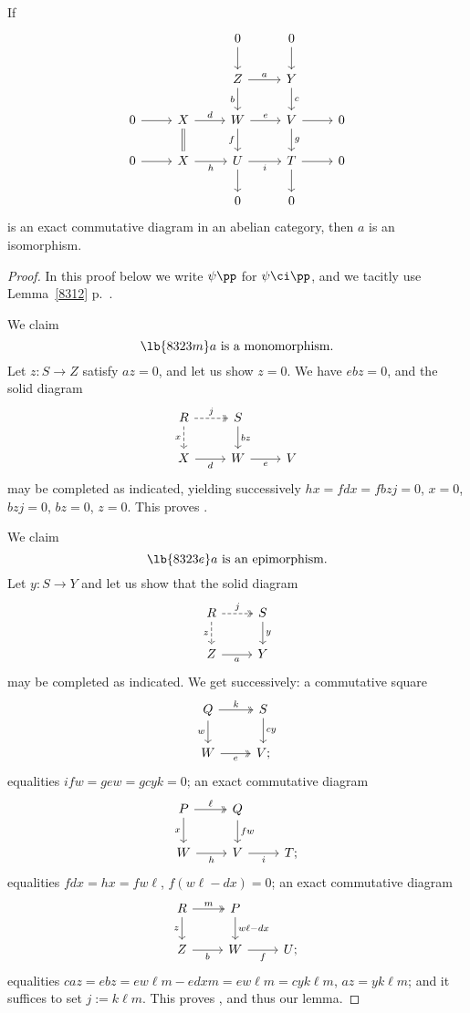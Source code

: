 \documentclass[12pt]{article}
\theoremstyle{remark}
\theoremstyle{definition}
\begin{document}
\begin{lem}
If
$$
\begin{tikzcd}
&&0\ar[d]&0\ar[d]\\ 
&&Z\ar[d,"b"']\ar[r,"a"]&Y\ar[d,"c"]\\ 
0\ar[r]&X\ar[d,equal]\ar[r,"d"]&W\ar[d,"f"']\ar[r,"e"]&V\ar[d,"g"]\ar[r]&0\\ 
0\ar[r]&X\ar[r,"h"']&U\ar[d]\ar[r,"i"']&T\ar[d]\ar[r]&0\\ 
&&0&0
\end{tikzcd}
$$ 
is an exact commutative diagram in an abelian category, then $a$ is an isomorphism. 
\end{lem}

\begin{proof}
In this proof below we write $\psi\pp$ for $\psi\ci\pp$, and we tacitly use Lemma~\ref{8312} p.~. 

We claim
\begin{equation}\lb{8323m}
a\text{ is a monomorphism}.
\end{equation}
Let $z:S\to Z$ satisfy $az=0$, and let us show $z=0$. We have $ebz=0$, and the solid diagram 
$$
\begin{tikzcd}
R\ar[d,"x"',dashed]\ar[r,"j",dashed,two heads]&S\ar[d,"bz"]\\ 
X\ar[r,"d"']&W\ar[r,"e"']&V
\end{tikzcd}
$$ 
may be completed as indicated, yielding successively $hx=fdx=fbzj=0$, $x=0$, $bzj=0$, $bz=0$, $z=0$. This proves . 

We claim
\begin{equation}\lb{8323e}
a\text{ is an epimorphism}.
\end{equation} 
Let $y:S\to Y$ and let us show that the solid diagram 
$$
\begin{tikzcd}
R\ar[d,"z"',dashed]\ar[r,"j",dashed,two heads]&S\ar[d,"y"]\\ 
Z\ar[r,"a"']&Y
\end{tikzcd}
$$ 
may be completed as indicated. We get successively: a commutative square 
$$
\begin{tikzcd}
Q\ar[d,"w"']\ar[r,"k",two heads]&S\ar[d,"cy"]\\ 
W\ar[r,"e"',two heads]&V;
\end{tikzcd}
$$ 
equalities $ifw=gew=gcyk=0$; an exact commutative diagram 
$$
\begin{tikzcd}
P\ar[d,"x"']\ar[r,"\ell",two heads]&Q\ar[d,"fw"]\\ 
W\ar[r,"h"']&V\ar[r,"i"']&T;
\end{tikzcd}
$$ 
equalities $fdx=hx=fw\ell$, $f(w\ell-dx)=0$; an exact commutative diagram 
$$
\begin{tikzcd}
R\ar[d,"z"']\ar[r,"m",two heads]&P\ar[d,"w\ell-dx"]\\ 
Z\ar[r,"b"']&W\ar[r,"f"']&U;
\end{tikzcd}
$$ 
equalities $caz=ebz=ew\ell m-edxm=ew\ell m=cyk\ell m$, $az=yk\ell m$; and it suffices to set $j:=k\ell m$. This proves , and thus our lemma. %
\end{proof}
\end{document}
